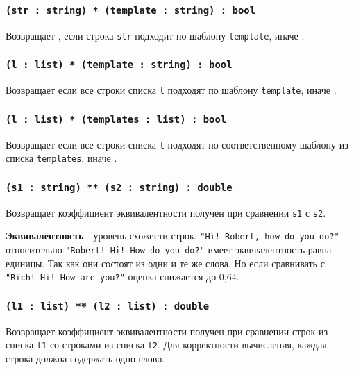 \subsubsection{\texttt{(str : string) * (template : string) : bool}}

Возвращает \true{}, если строка \texttt{str} подходит по шаблону \texttt{template}, иначе \false{}.

\subsubsection{\texttt{(l : list) * (template : string) : bool}}

Возвращает \true{} если все строки списка \texttt{l} подходят по шаблону \texttt{template}, иначе \false{}.

\subsubsection{\texttt{(l : list) * (templates : list) : bool}}

Возвращает \true{} если все строки списка \texttt{l} подходят по соответственному шаблону из списка \texttt{templates}, иначе \false{}.

\subsubsection{\texttt{(s1 : string) ** (s2 : string) : double}}

Возвращает коэффициент эквивалентности получен при сравнении \texttt{s1} с \texttt{s2}.

{\bf Эквивалентность} - уровень схожести строк. \texttt{"Hi! Robert, how do you do?"} относительно \texttt{"Robert! Hi! How do you do?"} имеет эквивалентность равна единицы. Так как они состоят из одни и те же слова. Но если сравнивать с  \texttt{"Rich! Hi! How are you?"} оценка снижается до 0,64.

\subsubsection{\texttt{(l1 : list) ** (l2 : list) : double}}

Возвращает коэффициент эквивалентности получен при сравнении строк из списка \texttt{l1} со строками из списка \texttt{l2}.
Для корректности вычисления, каждая строка должна содержать одно слово.

